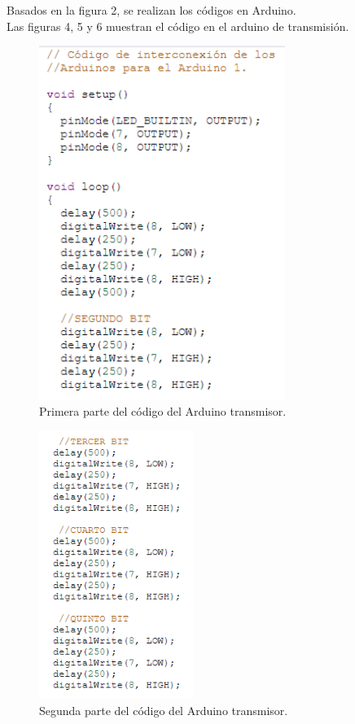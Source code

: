 \documentclass{article}
\begin{document}
Basados en la figura 2, se realizan los códigos en Arduino.\\


Las figuras 4, 5 y 6 muestran el código en el arduino de transmisión.\\

\newpage

\begin{figure}[h]
\includegraphics[width=8cm]{codigo_arduino1_1.PNG}
\centering
\caption{Primera parte del código del Arduino transmisor.}
\label{fig:codigo_arduino1_1.PNG}
\end{figure}

\newpage

\begin{figure}[h]
\includegraphics[width=5cm]{codigo_arduino1_2.PNG}
\centering
\caption{Segunda parte del código del Arduino transmisor.}
\label{fig:codigo_arduino1_2.PNG}
\end{figure}
\end{document}
